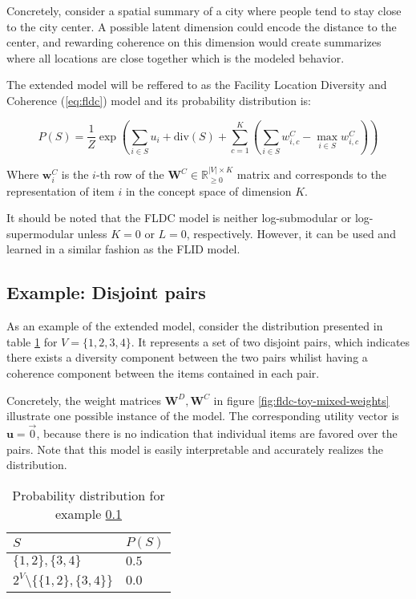 Concretely, consider a spatial summary of a city where people tend to stay close to the city center. A possible latent dimension could encode the distance to the center, and rewarding coherence on this dimension would create summarizes where all locations are close together which is the modeled behavior.

The extended model will be reffered to as the Facility Location Diversity and Coherence (\ref{eq:fldc}) model and its probability distribution is:

\begin{equation}
  \tag{FLDC}
  P(S) = \frac{1}{Z}\exp{\left(\sum_{i \in S}{u_{i}} + \mathrm{div}(S) + \sum_{c=1}^{K}{\left(\sum_{i \in S}{w^{C}_{i,c}} - \max_{i \in S}{w^{C}_{i,c}}\right)}\right)}
  \label{eq:fldc}
\end{equation}

Where $\mathbf{w}_{i}^{C}$ is the $i$-th row of the $\mathbf{W}^{C} \in \mathbb{R}_{\geq 0}^{|V| \times K}$ matrix and corresponds to the representation of item $i$ in the concept space of dimension $K$.

It should be noted that the FLDC model is neither log-submodular or log-supermodular unless $K=0$ or $L=0$, respectively. However, it can be used and learned in a similar fashion as the FLID model.

\subsection{Example: Disjoint pairs}
\label{sec:fldc-toy}

As an example of the extended model, consider the distribution presented in table \ref{tab:fldc-toy-probs} for $V = \{1,2,3,4\}$. It represents a set of two disjoint pairs, which indicates there exists a diversity component between the two pairs whilist having a coherence component between the items contained in each pair.

Concretely, the weight matrices $\mathbf{W}^{D}, \mathbf{W}^{C}$ in figure \ref{fig:fldc-toy-mixed-weights} illustrate one possible instance of the model. The corresponding utility vector is $\mathbf{u} = \overrightarrow{0}$, because there is no indication that individual items are favored over the pairs. Note that this model is easily interpretable and accurately realizes the distribution.

\begin{table}
  \centering
  \caption{Probability distribution for example \ref{sec:fldc-toy}}
  \begin{tabular}{@{}ll@{}}
    \toprule
    $S$ & $P(S)$  \\
    \midrule
    $\{1,2\}, \{3,4\}$ & $0.5$ \\
    $2^V \setminus \{\{1,2\}, \{3,4\}\}$ & $0.0$ \\
    \bottomrule
  \end{tabular}
  \label{tab:fldc-toy-probs}
\end{table}

